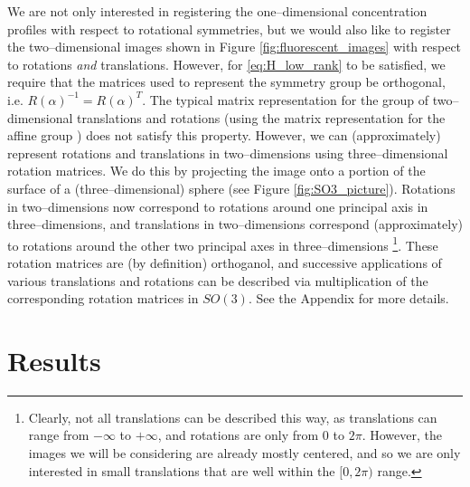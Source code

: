 \documentclass[11pt]{article}
\begin{document}
We are not only interested in registering the one--dimensional concentration profiles with respect to rotational symmetries, but we would also like to register the two--dimensional images shown in Figure \ref{fig:fluorescent_images} with respect to rotations {\em and} translations. 
%
However, for \eqref{eq:H_low_rank} to be satisfied, we require that the matrices used to represent the symmetry group be orthogonal, i.e. $R(\alpha)^{-1} = R(\alpha)^T$. 
%
The typical matrix representation for the group of two--dimensional translations and rotations (using the matrix representation for the affine group \cite{...}) does not satisfy this property. 
%
However, we can (approximately) represent rotations and translations in two--dimensions using three--dimensional rotation matrices.
%
We do this by projecting the image onto a portion of the surface of a (three--dimensional) sphere (see Figure \ref{fig:SO3_picture}).
%
Rotations in two--dimensions now correspond to rotations around one principal axis in three--dimensions, and translations in two--dimensions correspond (approximately) to rotations around the other two principal axes in three--dimensions \footnote{Clearly, not all translations can be described this way, as translations can range from $-\infty$ to $+ \infty$, and rotations are only from $0$ to $2 \pi$. However, the images we will be considering are already mostly centered, and so we are only interested in small translations that are well within the $[0, 2\pi)$ range.}.
%
These rotation matrices are (by definition) orthoganol, and successive applications of various translations and rotations can be described via multiplication of the corresponding rotation matrices in $SO(3)$.
%
See the Appendix for more details.

\section{Results}
\end{document}

